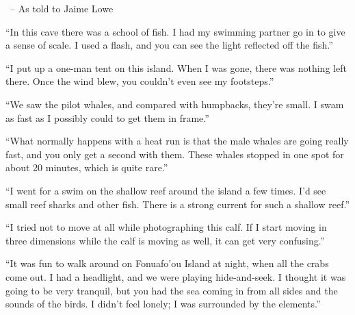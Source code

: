 ~-- As told to Jaime Lowe

``In this cave there was a school of fish. I had my swimming partner go
in to give a sense of scale. I used a flash, and you can see the light
reflected off the fish.''~

``I put up a one-man tent on this island. When I was gone, there was
nothing left there. Once the wind blew, you couldn't even see my
footsteps.''~

``We saw the pilot whales, and compared with humpbacks, they're small. I
swam as fast as I possibly could to get them in frame.''

``What normally happens with a heat run is that the male whales are
going really fast, and you only get a second with them. These whales
stopped in one spot for about 20 minutes, which is quite rare.''

``I went for a swim on the shallow reef around the island a few times.
I'd see small reef sharks and other fish. There is a strong current for
such a shallow reef.''

``I tried not to move at all while photographing this calf. If I start
moving in three dimensions while the calf is moving as well, it can get
very confusing.''

``It was fun to walk around on Fonuafo'ou Island at night, when all the
crabs come out. I had a headlight, and we were playing hide-and-seek. I
thought it was going to be very tranquil, but you had the sea coming in
from all sides and the sounds of the birds. I didn't feel lonely; I was
surrounded by the elements.''

\subsection{}

